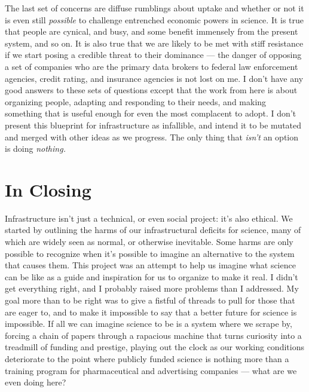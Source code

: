 The last set of concerns are diffuse rumblings about uptake and whether
or not it is even still \emph{possible} to challenge entrenched economic
powers in science. It is true that people are cynical, and busy, and
some benefit immensely from the present system, and so on. It is also
true that we are likely to be met with stiff resistance if we start
posing a credible threat to their dominance --- the danger of opposing a
set of companies who are the primary data brokers to federal law
enforcement agencies, credit rating, and insurance agencies is not lost
on me. I don't have any good answers to these sets of questions except
that the work from here is about organizing people, adapting and
responding to their needs, and making something that is useful enough
for even the most complacent to adopt. I don't present this blueprint
for infrastructure as infallible, and intend it to be mutated and merged
with other ideas as we progress. The only thing that \emph{isn't} an
option is doing \emph{nothing.}

\hypertarget{in-closing}{%
\section{In Closing}\label{in-closing}}

Infrastructure isn't just a technical, or even social project: it's also
ethical. We started by outlining the harms of our infrastructural
deficits for science, many of which are widely seen as normal, or
otherwise inevitable. Some harms are only possible to recognize when
it's possible to imagine an alternative to the system that causes them.
This project was an attempt to help us imagine what science can be like
as a guide and inspiration for us to organize to make it real. I didn't
get everything right, and I probably raised more problems than I
addressed. My goal more than to be right was to give a fistful of
threads to pull for those that are eager to, and to make it impossible
to say that a better future for science is impossible. If all we can
imagine science to be is a system where we scrape by, forcing a chain of
papers through a rapacious machine that turns curiosity into a treadmill
of funding and prestige, playing out the clock as our working conditions
deteriorate to the point where publicly funded science is nothing more
than a training program for pharmaceutical and advertising companies ---
what are we even doing here?

